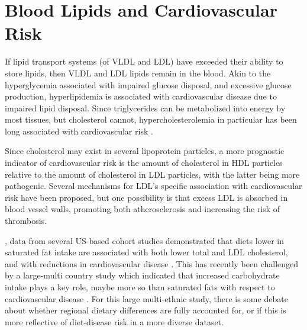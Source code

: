 \documentclass{tufte-handout}
\begin{document}
\section{Blood Lipids and Cardiovascular Risk}

If lipid transport systems (of VLDL and LDL) have exceeded their ability to store lipids, then VLDL and LDL lipids remain in the blood.  Akin to the hyperglycemia associated with impaired glucose disposal, and excessive glucose production, hyperlipidemia is associated with cardiovascular disease due to impaired lipid disposal.  Since triglycerides can be metabolized into energy by most tissues, but cholesterol cannot, hypercholesterolemia in particular has been long associated with cardiovascular risk \citep{Keys1963}.

Since cholesterol may exist in several lipoprotein particles, a more prognostic indicator of cardiovascular risk is the amount of cholesterol in HDL particles relative to the amount of cholesterol in LDL particles, with the latter being more pathogenic.  Several mechanisms for LDL's specific association with cardiovascular risk have been proposed, but one possibility is that excess LDL is absorbed in blood vessel walls, promoting both atherosclerosis and increasing the risk of thrombosis.

, data from several US-based cohort studies demonstrated that diets lower in saturated fat intake are associated with both lower total and LDL cholesterol, and with reductions in cardiovascular disease \citep{Anderson1987,Wang2016b}.  This has recently been challenged by a large-multi country study which indicated that increased carbohydrate intake plays a key role, maybe more so than saturated fats with respect to cardiovascular disease \citep{Mente2017}.  For this large multi-ethnic study, there is some debate about whether regional dietary differences are fully accounted for, or if this is more reflective of diet-disease risk in a more diverse dataset.  



\end{document}
